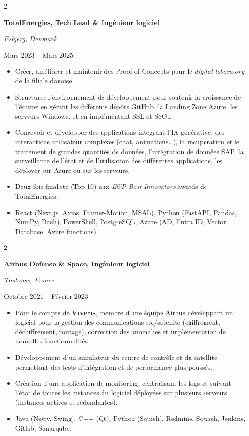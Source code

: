 \documentclass[10pt, letterpaper]{article}
\newenvironment{highlights}{
    \begin{itemize}[
        topsep=0.10 cm,
        parsep=0.10 cm,
        partopsep=0pt,
        itemsep=0pt,
        leftmargin=0.4 cm + 10pt
    ]
}{
    \end{itemize}
} %
\newenvironment{twocolentry}[2][]{
    \onecolentry
    \def\secondColumn{#2}
    \setcolumnwidth{\fill, 6 cm}
    \begin{paracol}{2}
}{
    \switchcolumn \raggedleft \secondColumn
    \end{paracol}
    \endonecolentry
} %
\begin{document}
        \begin{twocolentry}{\color{secondaryColor}Mars 2023 – Mars 2025}
            \textbf{TotalEnergies, Tech Lead \& Ingénieur logiciel}

            \textit{Esbjerg, Denmark}
        \end{twocolentry}
        \begin{highlights}
            \item Créer, améliorer et maintenir des Proof of Concepts pour le \textit{digital laboratory} de la filiale danoise.
            \item Structurer l’environnement de développement pour soutenir la croissance de l'équipe en gérant les différents dépôts GitHub, la Landing Zone Azure, les serveurs Windows, et en implémentant SSL et SSO…
            \item Concevoir et développer des applications intégrant l’IA générative, des interactions utilisateur complexes (chat, animations…), la récupération et le traitement de grandes quantités de données, l’intégration de données SAP, la surveillance de l’état et de l’utilisation des différentes applications, les déployer sur Azure ou sur les serveurs.
            \item Deux fois finaliste (Top 10) aux \textit{E\&P Best Innovators} awards de TotalEnergies.
            \item React (Next.js, Axios, Framer-Motion, MSAL), Python (FastAPI, Pandas, NumPy, Dash), PowerShell, PostgreSQL, Azure (AD, Entra ID, Vector Database, Azure functions).
        \end{highlights}

        \vspace{0.2 cm}

        \begin{twocolentry}{\color{secondaryColor}Octobre 2021 – Février 2023}
            \textbf{Airbus Defense \& Space, Ingénieur logiciel}

            \textit{Toulouse, France}
        \end{twocolentry}
        \begin{highlights}
            \item Pour le compte de \textbf{Viveris}, membre d’une équipe Airbus développant un logiciel pour la gestion des communications sol/satellite (chiffrement, déchiffrement, routage), correction des anomalies et implémentation de nouvelles fonctionnalités.
            \item Développement d’un simulateur du centre de contrôle et du satellite permettant des tests d’intégration et de performance plus poussés.
            \item Création d’une application de monitoring, centralisant les logs et suivant l’état de toutes les instances du logiciel déployées sur plusieurs serveurs (instances actives et redondantes).
            \item Java (Netty, Swing), C++ (Qt), Python (Squish), Redmine, Squash, Jenkins, Gitlab, Sonarqube.
        \end{highlights}
        
\end{document}
